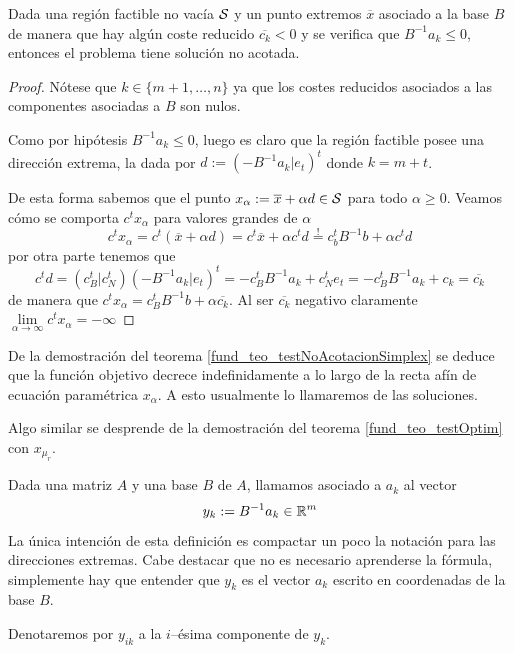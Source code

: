 \begin{theo}
	\label{fund_teo_testNoAcotacionSimplex}
	Dada una región factible no vacía $\mathcal{S}$ y un punto extremos $\overline{x}$ asociado a la base $B$ de manera que hay algún coste reducido $\overline{c_k}<0$ y se verifica que $B^{-1}a_k\leq 0$, entonces el problema tiene solución no acotada.
\end{theo}
\begin{proof}
	Nótese que $k\in\{m+1,\dots,n\}$ ya que los costes reducidos asociados a las componentes asociadas a $B$ son nulos.
	
	Como por hipótesis $B^{-1}a_k\leq 0$, luego es claro que la región factible posee una dirección extrema, la dada por $d:=(-B^{-1}a_k|e_t)^t$ donde $k=m+t$.
	
	De esta forma sabemos que el punto $x_\alpha:=\overline{x}+\alpha d\in\mathcal{S}$ para todo $\alpha\geq 0$. Veamos cómo se comporta $c^tx_\alpha$ para valores grandes de $\alpha$
	\begin{equation*}
		c^tx_\alpha=c^t(\overline{x}+\alpha d)=c^t\overline{x}+\alpha c^td\stackrel{!}{=}c_b^tB^{-1}b+\alpha c^td
	\end{equation*}
	por otra parte tenemos que
	\begin{equation*}
		c^td =(c_B^t|c_N^t)(-B^{-1}a_k|e_t)^t=-c_B^tB^{-1}a_k+c_N^te_t=-c_B^tB^{-1}a_k+c_k=\overline{c_k}
	\end{equation*}
	de manera que $c^tx_\alpha=c_B^tB^{-1}b+\alpha\overline{c_k}$. Al ser $\overline{c_k}$ negativo claramente $\lim\limits_{\alpha\to\infty}c^tx_\alpha=-\infty$
\end{proof}
\begin{obs}
	De la demostración del teorema \ref{fund_teo_testNoAcotacionSimplex} se deduce que la función objetivo decrece indefinidamente a lo largo de la recta afín de ecuación paramétrica $x_\alpha$. A esto usualmente lo llamaremos  de las soluciones.
	
	Algo similar se desprende de la demostración del teorema \ref{fund_teo_testOptim} con $x_{\mu_r}$.
\end{obs}
\begin{defi}
	\label{fund_defi_vectorAux}
	Dada una matriz $A$ y una base $B$ de $A$, llamamos  asociado a $a_k$ al vector
	\begin{equation*}
		y_k:=B^{-1}a_k\in\mathbb{R}^m
	\end{equation*}
	La única intención de esta definición es compactar un poco la notación para las direcciones extremas. Cabe destacar que no es necesario aprenderse la fórmula, simplemente hay que entender que $y_k$ es el vector $a_k$ escrito en coordenadas de la base $B$.
	
	Denotaremos por $y_{ik}$ a la $i$--ésima componente de $y_k$.
\end{defi}
